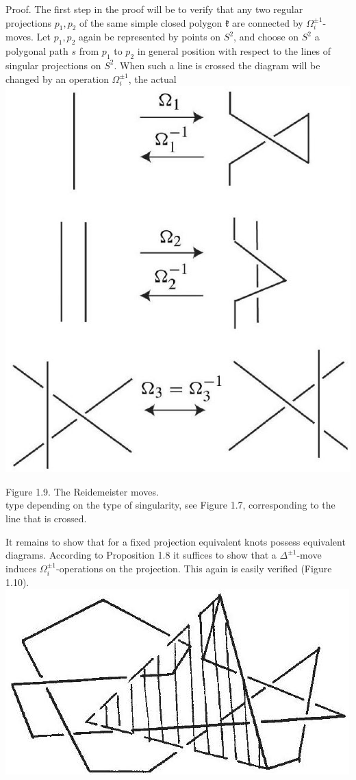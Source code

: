 \documentclass[10pt, letterpaper]{article}
\begin{document}
Proof. The first step in the proof will be to verify that any two regular projections $p_{1}, p_{2}$ of the same simple closed polygon $\mathfrak{k}$ are connected by $\Omega_{i}^{ \pm 1}$-moves. Let $p_{1}, p_{2}$ again be represented by points on $S^{2}$, and choose on $S^{2}$ a polygonal path $s$ from $p_{1}$ to $p_{2}$ in general position with respect to the lines of singular projections on $S^{2}$. When such a line is crossed the diagram will be changed by an operation $\Omega_{i}^{ \pm 1}$, the actual\\
\includegraphics[scale=0.2, center]{2025_05_21_9c06be8de7a55410f8c1g-025(1)}

Figure 1.9. The Reidemeister moves.\\
type depending on the type of singularity, see Figure 1.7, corresponding to the line that is crossed.

It remains to show that for a fixed projection equivalent knots possess equivalent diagrams. According to Proposition 1.8 it suffices to show that a $\Delta^{ \pm 1}$-move induces $\Omega_{i}^{ \pm 1}$-operations on the projection. This again is easily verified (Figure 1.10).\\
\includegraphics[scale=0.2, center]{2025_05_21_9c06be8de7a55410f8c1g-025}
\end{document}
